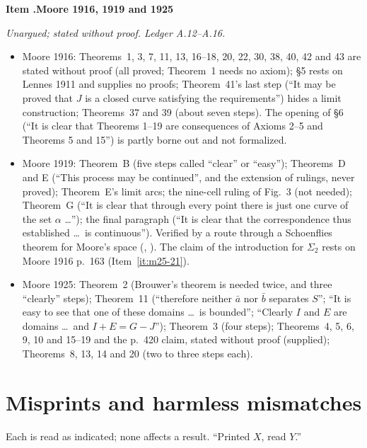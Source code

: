 \documentclass[11pt]{article}
\newcounter{defect}
\newenvironment{defect}[4]{%
  \par\addvspace{10pt}\refstepcounter{defect}%
  \noindent\textbf{Item \thedefect.\enspace #1}\par\nopagebreak
  \noindent\textit{#2}\par\nopagebreak\smallskip}{\par\addvspace{6pt}}
\begin{document}
\begin{defect}{Moore 1916, 1919 and 1925}{Unargued; stated without proof. Ledger
A.12--A.16.}{0}{0}\label{it:un-moore}
\begin{itemize}
\item Moore 1916: Theorems~1, 3, 7, 11, 13, 16--18, 20, 22, 30, 38, 40, 42 and 43 are stated without
  proof (all proved; Theorem~1 needs no axiom); \S5 rests on Lennes 1911 and supplies no proofs;
  Theorem~41's last step (``It may be proved that $J$ is a closed curve satisfying the
  requirements'') hides a limit construction; Theorems~37 and 39 (about seven steps). The opening
  of \S6 (``It is clear that Theorems 1--19 are consequences of Axioms 2--5 and Theorems 5 and 15'')
  is partly borne out and not formalized.
\item Moore 1919: Theorem~B (five steps called ``clear'' or ``easy''); Theorems~D and E (``This
  process may be continued'', and the extension of rulings, never proved); Theorem~E's limit arcs;
  the nine-cell ruling of Fig.~3 (not needed); Theorem~G (``It is clear that through every point
  there is just one curve of the set $\alpha$ \ldots''); the final paragraph (``It is clear that the
  correspondence thus established \ldots\ is continuous''). Verified by a route through a Schoenflies
  theorem for Moore's space (, ). The claim of the introduction
  for $\Sigma_2$ rests on Moore 1916 p.~163 (Item~\ref{it:m25-21}).
\item Moore 1925: Theorem~2 (Brouwer's theorem is needed twice, and three ``clearly'' steps);
  Theorem~11 (``therefore neither $\bar a$ nor $\bar b$ separates $S$''; ``It is easy to see that
  one of these domains \ldots\ is bounded''; ``Clearly $I$ and $E$ are domains \ldots\ and
  $I+E=G-J$'');
  Theorem~3 (four steps); Theorems~4, 5, 6, 9, 10 and 15--19 and the p.~420 claim, stated without
  proof (supplied); Theorems~8, 13, 14 and 20 (two to three steps each).
\end{itemize}
\end{defect}

\section{Misprints and harmless mismatches}\label{sec:misprints}

Each is read as indicated; none affects a result. ``Printed $X$, read $Y$.''
\end{document}
